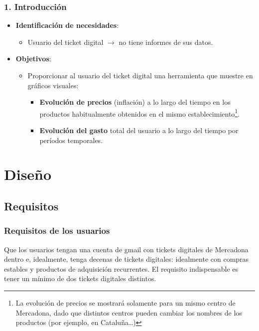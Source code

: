 \documentclass{beamer}
\begin{document}
\begin{frame}
	\frametitle{1. Introducción}
	\begin{itemize}
		\item \textbf{Identificación de necesidades}:
		\begin{itemize}
			\item Usuario del ticket digital $\rightarrow$ no tiene informes de sus datos.
		\end{itemize}
		
		\item \textbf{Objetivos}:
		\begin{itemize}
			\item Proporcionar al usuario del ticket digital una herramienta que muestre en gráficos visuales:
			\begin{itemize}
				\item \textbf{Evolución de precios} (inflación) a lo largo del tiempo en los productos habitualmente obtenidos en el mismo establecimiento\footnote{La evolución de precios se mostrará solamente para un mismo centro de Mercadona, dado que distintos centros pueden cambiar los nombres de los productos (por ejemplo, en Cataluña…)}.
				\item \textbf{Evolución del gasto} total del usuario a lo largo del tiempo por períodos temporales.
			\end{itemize}
		\end{itemize}
	\end{itemize}
\end{frame}

			
			
			

			
			

	
	
	
	
	
		\section{Diseño}
	
	


			
			\subsection{Requisitos}
				\begin{frame}
					\frametitle{Requisitos de los usuarios}
					
					Que los usuarios tengan una cuenta de gmail con tickets digitales de Mercadona dentro e, idealmente, tenga decenas de tickets digitales: idealmente con compras estables y productos de adquisición recurrentes. El requisito indispensable es tener un mínimo de dos tickets digitales distintos.
		
				\end{frame}
				
\end{document}
